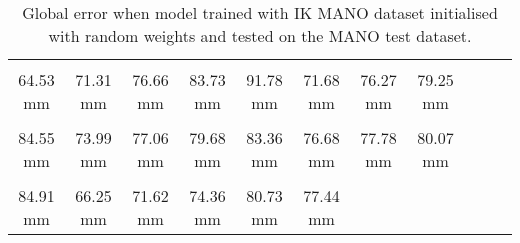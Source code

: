 \begin{table}[!ht]
    \begin{tabular}{|c|c|c|c|c|c|c|c|c|c|c|}
    \hline
    \cellcolor[HTML]{ff8000}{\bfseries Wrist} & \cellcolor[HTML]{ff7500}{\bfseries IMCP} & \cellcolor[HTML]{ff7500}{\bfseries IPIP} & \cellcolor[HTML]{ff2500}{\bfseries IDIP} & \cellcolor[HTML]{ff0000}{\bfseries ITIP} & \cellcolor[HTML]{ff7500}{\bfseries MMCP} & \cellcolor[HTML]{ff7500}{\bfseries MPIP} & \cellcolor[HTML]{ff7500}{\bfseries MDIP}  \\
    \cellcolor[HTML]{ff8000}$\,\,\,$64.53 mm & \cellcolor[HTML]{ff7500}$\,\,\,$71.31 mm & \cellcolor[HTML]{ff7500}$\,\,\,$76.66 mm & \cellcolor[HTML]{ff2500}$\,\,\,$83.73 mm & \cellcolor[HTML]{ff0000}$\,\,\,$91.78 mm & \cellcolor[HTML]{ff7500}$\,\,\,$71.68 mm & \cellcolor[HTML]{ff7500}$\,\,\,$76.27 mm & \cellcolor[HTML]{ff7500}$\,\,\,$79.25 mm\\
    \hline
    \cellcolor[HTML]{ff2500}{\bfseries MTIP} & \cellcolor[HTML]{ff7500}{\bfseries RMCP} & \cellcolor[HTML]{ff7500}{\bfseries RPIP} & \cellcolor[HTML]{ff7500}{\bfseries RDIP} & \cellcolor[HTML]{ff2500}{\bfseries RTIP} & \cellcolor[HTML]{ff7500}{\bfseries PMCP} & \cellcolor[HTML]{ff7500}{\bfseries PPIP} & \cellcolor[HTML]{ff2500}{\bfseries PDIP}  \\
    \cellcolor[HTML]{ff2500}$\,\,\,$84.55 mm & \cellcolor[HTML]{ff7500}$\,\,\,$73.99 mm & \cellcolor[HTML]{ff7500}$\,\,\,$77.06 mm & \cellcolor[HTML]{ff7500}$\,\,\,$79.68 mm & \cellcolor[HTML]{ff2500}$\,\,\,$83.36 mm & \cellcolor[HTML]{ff7500}$\,\,\,$76.68 mm & \cellcolor[HTML]{ff7500}$\,\,\,$77.78 mm & \cellcolor[HTML]{ff2500}$\,\,\,$80.07 mm\\
    \hline
    \cellcolor[HTML]{ff2500}{\bfseries PTIP} & \cellcolor[HTML]{ff8000}{\bfseries TMCP} & \cellcolor[HTML]{ff7500}{\bfseries TPIP} & \cellcolor[HTML]{ff7500}{\bfseries PDIP} & \cellcolor[HTML]{ff2500}{\bfseries TTIP} & \cellcolor[HTML]{ff7500}{\bfseries Average}  \\
    \cellcolor[HTML]{ff2500}$\,\,\,$84.91 mm & \cellcolor[HTML]{ff8000}$\,\,\,$66.25 mm & \cellcolor[HTML]{ff7500}$\,\,\,$71.62 mm & \cellcolor[HTML]{ff7500}$\,\,\,$74.36 mm & \cellcolor[HTML]{ff2500}$\,\,\,$80.73 mm & \cellcolor[HTML]{ff7500}$\,\,\,$77.44 mm \\
    \cline{1-6}
    \end{tabular}
    \caption{Global error when model trained with IK MANO dataset initialised with random weights and tested on the MANO test dataset.}
    \label{}
    \end{table}
